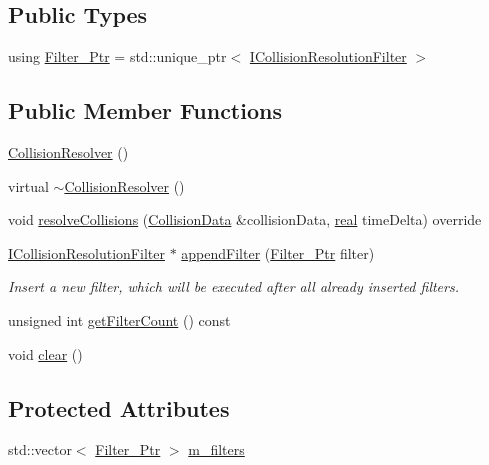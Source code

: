 \subsection*{Public Types}
\begin{DoxyCompactItemize}
\item 
using \mbox{\hyperlink{classr3_1_1_collision_resolver_ad1c9ca40341498c0fe4d483d21c8eb9b}{Filter\+\_\+\+Ptr}} = std\+::unique\+\_\+ptr$<$ \mbox{\hyperlink{classr3_1_1_i_collision_resolution_filter}{I\+Collision\+Resolution\+Filter}} $>$
\end{DoxyCompactItemize}
\subsection*{Public Member Functions}
\begin{DoxyCompactItemize}
\item 
\mbox{\hyperlink{classr3_1_1_collision_resolver_a7b90e276403fa8422879228a189432fb}{Collision\+Resolver}} ()
\item 
virtual \mbox{\hyperlink{classr3_1_1_collision_resolver_ad172d58efecf5ef38f42020f21746f02}{$\sim$\+Collision\+Resolver}} ()
\item 
void \mbox{\hyperlink{classr3_1_1_collision_resolver_a134da5221d60b34c568f7de29c9d0a58}{resolve\+Collisions}} (\mbox{\hyperlink{classr3_1_1_collision_data}{Collision\+Data}} \&collision\+Data, \mbox{\hyperlink{namespacer3_ab2016b3e3f743fb735afce242f0dc1eb}{real}} time\+Delta) override
\item 
\mbox{\hyperlink{classr3_1_1_i_collision_resolution_filter}{I\+Collision\+Resolution\+Filter}} $\ast$ \mbox{\hyperlink{classr3_1_1_collision_resolver_a9409413937188dbd5332c3440c2a8834}{append\+Filter}} (\mbox{\hyperlink{classr3_1_1_collision_resolver_ad1c9ca40341498c0fe4d483d21c8eb9b}{Filter\+\_\+\+Ptr}} filter)
\begin{DoxyCompactList}\small\item\em Insert a new filter, which will be executed after all already inserted filters. \end{DoxyCompactList}\item 
unsigned int \mbox{\hyperlink{classr3_1_1_collision_resolver_ae56e2125e24982ad368f0d87e9c2a28f}{get\+Filter\+Count}} () const
\item 
void \mbox{\hyperlink{classr3_1_1_collision_resolver_a1f4e3d97afae66c03581807a529678cd}{clear}} ()
\end{DoxyCompactItemize}
\subsection*{Protected Attributes}
\begin{DoxyCompactItemize}
\item 
std\+::vector$<$ \mbox{\hyperlink{classr3_1_1_collision_resolver_ad1c9ca40341498c0fe4d483d21c8eb9b}{Filter\+\_\+\+Ptr}} $>$ \mbox{\hyperlink{classr3_1_1_collision_resolver_abf1234ad45ba7f114b31950c90ccaaff}{m\+\_\+filters}}
\end{DoxyCompactItemize}
